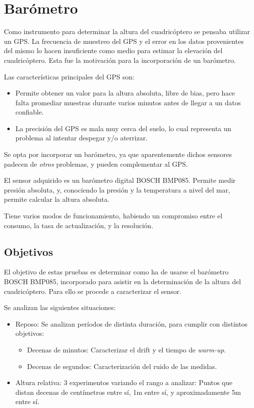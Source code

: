 \documentclass[main]{subfiles}
\begin{document}
\chapter{Barómetro}
\label{chap:barometro}

Como instrumento para determinar la altura del cuadricóptero se pensaba utilizar un GPS. La frecuencia de muestreo del GPS y el error en los datos provenientes del mismo lo hacen insuficiente como medio para estimar la elevación del cuadricóptero. Esta fue la motivación para la incorporación de un barómetro.

Las características principales del GPS son:
\begin{itemize}
\item Permite obtener un valor para la altura absoluta, libre de bias, pero hace falta promediar muestras durante varios minutos antes de llegar a un datos confiable.
\item  La precisión del GPS es mala muy cerca del suelo, lo cual representa un problema al intentar despegar y/o aterrizar.
\end{itemize}

Se opta por incorporar un barómetro, ya que aparentemente dichos sensores padecen de \textit{otros} problemas, y pueden complementar al GPS.

El sensor adquirido es un barómetro digital BOSCH BMP085. Permite medir presión absoluta, y, conociendo la presión y la temperatura a nivel del mar, permite calcular la altura absoluta.

Tiene varios modos de funcionamiento, habiendo un compromiso entre el consumo, la tasa de actualización, y la resolución.

\section{Objetivos}

El objetivo de estas pruebas es determinar como ha de usarse el barómetro BOSCH BMP085, incorporado para asistir en la determinación de la altura del cuadricóptero. Para ello se procede a caracterizar el sensor.

Se analizan las siguientes situaciones:

\begin{itemize}
\item Reposo: Se analizan períodos de distinta duración, para cumplir con distintos objetivos:
  \begin{itemize}
  \item Decenas de minutos: Caracterizar el drift y el tiempo de \textit{warm-up}.
  \item Decenas de segundos: Caracterización del ruido de las medidas.
  \end{itemize}
\item Altura relativa: 3 experimentos variando el rango a analizar: Puntos que distan decenas de centímetros entre sí, 1m entre sí, y aproximadamente 5m entre sí.
\end{itemize}
\end{document}
